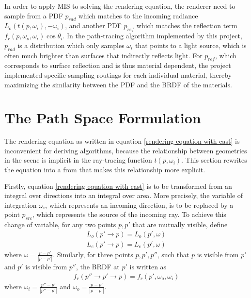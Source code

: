 In order to apply MIS to solving the rendering equation, the renderer need to sample from a PDF $p_{rad}$ which matches to the incoming radiance $L_o(t(p,\omega_i),-\omega_i)$, and another PDF $p_{ref}$ which matches the reflection term $f_r(p,\omega_o,\omega_i)\cos\theta_i$. In the path-tracing algorithm implemented by this project, $p_{rad}$ is a distribution which only samples $\omega_i$ that points to a light source, which is often much brighter than surfaces that indirectly reflects light. For $p_{ref}$, which corresponds to surface reflection and is thus material dependent, the project implemented specific sampling routings for each individual material, thereby maximizing the similarity between the PDF and the BRDF of the materials. 


\section{The Path Space Formulation}
The rendering equation as written in equation \ref{rendering equation with cast} is inconvenient for deriving algorithms, because the relationship between geometries in the scene is implicit in the ray-tracing function $t(p,\omega_i)$. This section rewrites the equation into a from that makes this relationship more explicit.

Firstly, equation \ref{rendering equation with cast} is to be transformed from an integral over directions into an integral over area. More precisely, the variable of integration $\omega_i$, which represents an incoming direction, is to be replaced by a point $p_{src}$, which represents the source of the incoming ray. To achieve this change of variable, for any two points $p,p'$ that are mutually visible, define 
\begin{align*}
    L_o(p'\to p) = L_o(p',\omega)\\
    L_e(p'\to p) = L_e(p',\omega)
\end{align*}
where $\omega = \frac{p-p'}{|p-p'|}$. Similarly, for three points $p,p',p''$, such that $p$ is visible from $p'$ and $p'$ is visible from $p''$, the BRDF at $p'$ is written as
\begin{align*}
    f_r(p''\to p'\to p) = f_r(p',\omega_o,\omega_i)
\end{align*} 
where $\omega_i = \frac{p''-p'}{|p''-p'|}$ and $\omega_o = \frac{p-p'}{|p-p'|}$.

